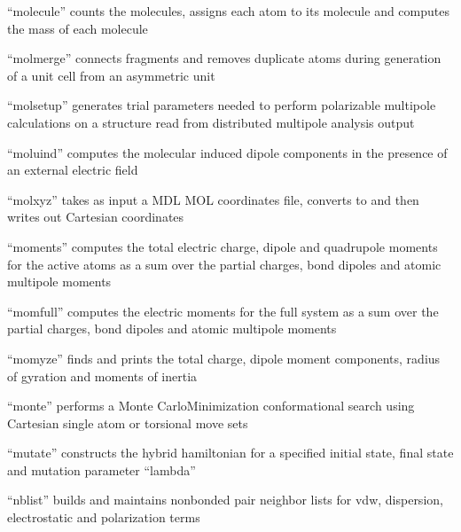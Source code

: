 \documentclass[letterpaper,11pt,english]{sphinxmanual}
\begin{document}

“molecule” counts the molecules, assigns each atom to
its molecule and computes the mass of each molecule


“molmerge” connects fragments and removes duplicate atoms
during generation of a unit cell from an asymmetric unit


“molsetup” generates trial parameters needed to perform
polarizable multipole calculations on a structure read
from distributed multipole analysis output


“moluind” computes the molecular induced dipole components
in the presence of an external electric field


“molxyz” takes as input a MDL MOL coordinates file,
converts to and then writes out Cartesian coordinates


“moments” computes the total electric charge, dipole and
quadrupole moments for the active atoms as a sum over the
partial charges, bond dipoles and atomic multipole moments


“momfull” computes the electric moments for the full system
as a sum over the partial charges, bond dipoles and atomic
multipole moments


“momyze” finds and prints the total charge, dipole moment
components, radius of gyration and moments of inertia


“monte” performs a Monte Carlo\sphinxhyphen{}Minimization conformational
search using Cartesian single atom or torsional move sets


“mutate” constructs the hybrid hamiltonian for a specified
initial state, final state and mutation parameter “lambda”


“nblist” builds and maintains nonbonded pair neighbor lists
for vdw, dispersion, electrostatic and polarization terms
\end{document}
